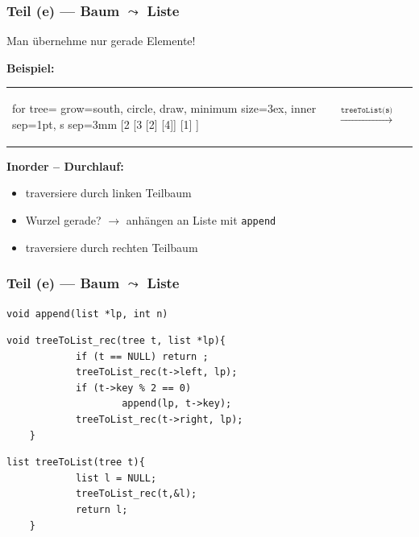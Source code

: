 \documentclass{beamer}
\begin{document}
\begin{frame}[fragile] \frametitle{Teil (e) --- Baum $\leadsto$ Liste}
	Man übernehme nur gerade Elemente!
	
	\textbf{Beispiel:}
	\begin{center}
		\begin{tabularx}{\linewidth}{m{2cm} m{2cm} m{2cm}}
			\begin{forest}
				for tree={ grow=south, circle, draw, minimum size=3ex, inner sep=1pt, s sep=3mm }
				[2 	[3 [2] [4]] [1] ]
			\end{forest}
			&
			$\overset{\texttt{treeToList(s)}}{\longrightarrow}$
			&
			\begin{ttfamily}
				[2, 4, 2]
			\end{ttfamily}
		\end{tabularx}
	\end{center}
	\pause
	\textbf{Inorder -- Durchlauf:}
	\begin{itemize}
		\item traversiere durch linken Teilbaum
		\item Wurzel gerade? $\to$ anhängen an Liste mit \texttt{append}
		\item traversiere durch rechten Teilbaum
	\end{itemize}
\end{frame}
\begin{frame}[fragile] \frametitle{Teil (e) --- Baum $\leadsto$ Liste}
	\begin{lstlisting}[style=notebook]
	void append(list *lp, int n)
	\end{lstlisting}
	\pause
	\begin{lstlisting}[style=notebook]
	void treeToList_rec(tree t, list *lp){
			if (t == NULL) return ;
			treeToList_rec(t->left, lp);
			if (t->key % 2 == 0)
					append(lp, t->key);
			treeToList_rec(t->right, lp);
	}	
	\end{lstlisting}
	\pause
	\begin{lstlisting}[style=notebook]
	list treeToList(tree t){
			list l = NULL;
			treeToList_rec(t,&l);
			return l;
	}
	\end{lstlisting}
\end{frame}
\end{document}
